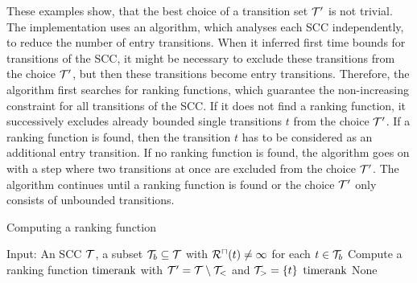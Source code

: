 These examples show, that the best choice of a transition set $\mathcal{T}'$ is not trivial.
The implementation uses an algorithm, which analyses each SCC independently, to reduce the number of entry transitions.
When it inferred first time bounds for transitions of the SCC, it might be necessary to exclude these transitions from the choice $\mathcal{T}'$, but then these transitions become entry transitions.
Therefore, the algorithm first searches for ranking functions, which guarantee the non-increasing constraint for all transitions of the SCC.
If it does not find a ranking function, it successively excludes already bounded single transitions $t$ from the choice $\mathcal{T}'$.
If a ranking function is found, then the transition $t$ has to be considered as an additional entry transition.
If no ranking function is found, the algorithm goes on with a step where two transitions at once are excluded from the choice $\mathcal{T}'$.
The algorithm continues until a ranking function is found or the choice $\mathcal{T}'$ only consists of unbounded transitions.

\begin{algorithm}
\caption{Computing a ranking function}\label{ranking_function_algorithm}
\begin{algorithmic}[1]
  \State Input: An SCC $\mathcal{T}$, a subset $\mathcal{T}_b \subseteq \mathcal{T}$ with ${\mathcal{R}^\sqcap}(t) \neq \infty$ for each $t \in \mathcal{T}_b$
        \State Compute a ranking function $\text{timerank}$ with $\mathcal{T}' = \mathcal{T} \setminus \mathcal{T}_<$ and $\mathcal{T}_> = \lbrace t \rbrace$
          \Return $\text{timerank}$
        \EndIf
      \EndFor
    \EndFor
  \EndFor
  \Return None
\end{algorithmic}
\end{algorithm}

